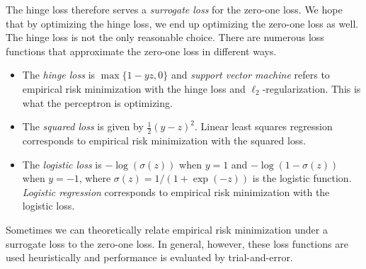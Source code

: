 \documentclass{tufte-book}
\begin{document}
The hinge loss therefore serves a \emph{surrogate loss} for the zero-one
loss. We hope that by optimizing the hinge loss, we end up optimizing
the zero-one loss as well. The hinge loss
is not the only reasonable choice. There are numerous loss functions
that approximate the zero-one loss in different ways.

\begin{itemize}
\tightlist
\item
  The \emph{hinge loss} is \(\max\{1-yz, 0\}\) and \emph{support vector
  machine} refers to empirical risk minimization with the hinge loss and
  \(\ell_2\)-regularization. This is what the perceptron is optimizing.
\item
  The \emph{squared loss} is given by \(\frac12(y-z)^2\). Linear least
  squares regression corresponds to empirical risk minimization with the
  squared loss. 
\item
  The \emph{logistic loss} is \(-\log(\sigma(z))\) when \(y=1\) and
  \(-\log(1-\sigma(z))\) when \(y=-1\), where
  \(\sigma(z) = 1/(1+\exp(-z))\) is the logistic function.
  \emph{Logistic regression} corresponds to empirical risk minimization
  with the logistic loss.
\end{itemize}

Sometimes we can theoretically relate empirical risk minimization under
a surrogate loss to the zero-one loss. In general, however, these loss
functions are used heuristically and performance is evaluated by
trial-and-error.
\end{document}
